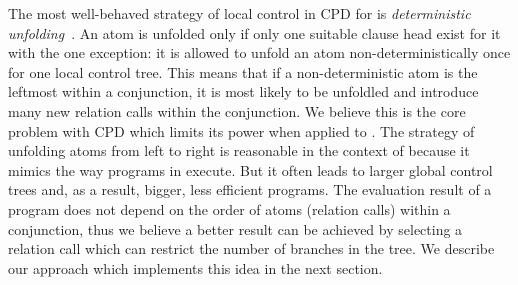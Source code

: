 The most well-behaved strategy of local control in CPD for \pro{} is \emph{deterministic unfolding}~\cite{leuschel1997advanced}.
An atom is unfolded only if only one suitable clause head exist for it with the one exception: it is allowed to unfold an atom non-deterministically once for one local control tree.
This means that if a non-deterministic atom is the leftmost within a conjunction, it is most likely to be unfoldled and introduce many new relation calls within the conjunction.
We believe this is the core problem with CPD which limits its power when applied to \mk{}.
The strategy of unfolding atoms from left to right is reasonable in the context of \pro{} because it mimics the way programs in \pro{} execute.
But it often leads to larger global control trees and, as a result, bigger, less efficient programs.
The evaluation result of a \mk{} program does not depend on the order of atoms (relation calls) within a conjunction, thus we believe a better result can be achieved by selecting a relation call which can restrict the number of branches in the tree.
We describe our approach which implements this idea in the next section.
